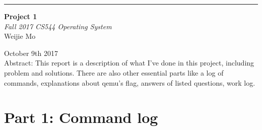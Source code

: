 \documentclass[10pt,draftclsnofoot,peerreview,letterpaper,onecolumn,]{IEEEtran}
\begin{document}
\begin{titlepage} %
	
	\raggedleft %
	
	\rule{1pt}{\textheight} %
	\hspace{0.05\textwidth} %
	\parbox[b]{0.75\textwidth}{ %
		
		{\Huge\bfseries Project 1 }\\[2\baselineskip] %
		{\large\textit{Fall 2017 CS544 Operating System}}\\[4\baselineskip] %
		{\Large Weijie Mo} %
		
		\vspace{0.5\textheight} %
		
		{\noindent October 9th 2017}\\[\baselineskip] %
        {\noindent Abstract:
    This report is a description of what I've done in this project, including problem and solutions. There are also other essential parts like a log of commands, explanations about qemu's flag, answers of listed questions, work log.}\\[\baselineskip] %
	}

\end{titlepage}

\section{Part 1: Command log}
\end{document}
